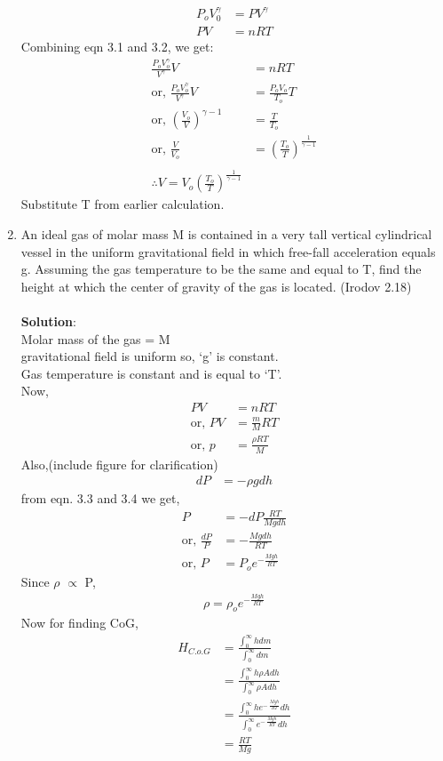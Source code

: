 \begin{enumerate}
\begin{align}
    P_oV_0 ^\gamma &=  PV^\gamma\\
    PV &= nRT 
\end{align}
Combining eqn 3.1 and 3.2, we get: 
\begin{align*}
    \frac{P_oV_o ^\gamma}{V^\gamma}V &= nRT \\
    \text{or, }\frac{P_oV_o ^\gamma}{V^\gamma}V &= \frac{P_o V_o}{T_o}T\\
    \text{or, }\left(\frac{V_o}{V}\right)^{\gamma -1} &= \frac{T}{T_o}\\
    \text{or, }\frac{V}{V_o} &= \left(\frac{T_o}{T}\right)^\frac{1}{\gamma -1}\\\\
    \therefore V = V_o\left(\frac{T_o}{T}\right)^\frac{1}{\gamma -1} 
\end{align*}
Substitute T from earlier calculation.

\item An ideal gas of molar mass M is contained in a very tall vertical cylindrical vessel in the uniform gravitational field in which free-fall acceleration equals g. Assuming the gas temperature to be the same and equal to T, find the height at which the center of gravity of the gas is located. (Irodov 2.18)\\\\
\textbf{Solution}: \\
Molar mass of the gas = M\\
gravitational field is uniform so, ‘g’ is constant. \\
Gas temperature is constant and is equal to ‘T’. \\
Now, 
\begin{align}
    PV &= nRT \nonumber\\
    \text{or, } PV &= \frac{m}{M} RT \nonumber\\
    \text{or, } p &= \frac{\rho RT}{M}
\end{align}
Also,(include figure for clarification)
\begin{align}
    dP &=  -\rho gdh 
\end{align}
from eqn. 3.3 and 3.4 we get, 
\begin{align*}
    P &= - dP\frac{RT}{Mgdh}\\
    \text{or, }\frac{dP}{P} &= - \frac{Mgdh}{RT}\\
    \text{or, }P &= P_o e^{-\frac{Mgh}{RT}}
\end{align*}
Since $\rho$ $\propto$ P, 
\begin{align*}
    \rho = \rho_oe^{-\frac{Mgh}{RT}}    
\end{align*}
Now for finding CoG, 
\begin{align*}
    H_{C.o.G} &=  \frac{\int_{0}^{\infty}{h dm}}{\int_{0}^{\infty}dm}\\
    &=  \frac{\int_{0}^{\infty}h\rho Adh}{\int_{0}^{\infty}\rho Adh}\\
    &= \frac{\int_{0}^{\infty}{he^{-\ \frac{Mgh}{RT}}dh}}{\int_{0}^{\infty}{e^{-\ \frac{Mgh}{RT}}dh}}\\
    &=  \frac{RT}{Mg}
\end{align*}
\end{enumerate}
